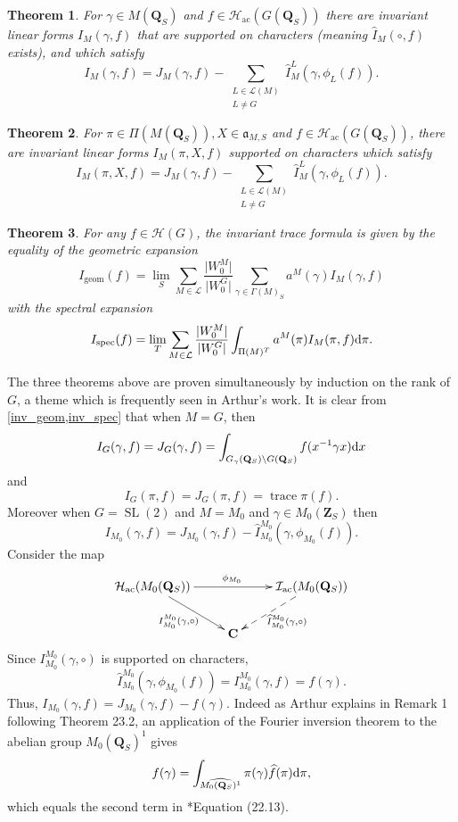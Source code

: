 \documentclass[11pt]{amsart}
\def\C{\mathbf C}
\def\Q{\mathbf Q}
\def\Z{\mathbf Z}
\def\HHH{\mathcal H}
\def\III{\mathcal I}
\def\LLL{\mathcal L}
\def\aaa{\mathfrak a}
\def\d{\text d}
\def\bs{\setminus}
\def\mod#1{\lvert #1 \rvert} %
\def\sl{\operatorname{SL}}
\def\trace{\operatorname{trace}}
\newtheorem{theorem}{Theorem}[section]
\theoremstyle{remark}
\begin{document}
\begin{theorem} \label{inv_geom}
For $\gamma \in M(\Q_S)$ and $f \in \HHH_{\text{ac}}(G(\Q_S))$ there are invariant linear forms $I_M(\gamma, f)$ that are supported on characters (meaning $\widehat I_M(\circ, f)$ exists), and which satisfy 
\[ I_M(\gamma, f) = J_M(\gamma, f) - \sum_{\substack{L \in \LLL(M) \\ L \neq G}} \widehat I_M^L(\gamma, \phi_L(f)). \]
\end{theorem}

\begin{theorem} \label{inv_spec}
For $\pi \in \Pi(M(\Q_S)), X \in \aaa_{M, S}$ and $f \in \HHH_{\text{ac}}(G(\Q_S))$, there are invariant linear forms $I_M(\pi, X, f)$ supported on characters which satisfy
\[ I_M(\pi, X, f) = J_M(\gamma, f) - \sum_{\substack{L \in \LLL(M) \\ L \neq G}} \widehat I_M^L(\gamma, \phi_L(f)). \]
\end{theorem}

\begin{theorem} \label{invtf}
For any $f \in \HHH(G)$, the invariant trace formula is given by the equality of the geometric expansion
\[ I_{\text{geom}}(f) = \lim_S \sum_{M \in \LLL} \frac{\mod{W_0^M}}{\mod{W_0^G}} \sum_{\gamma \in \Gamma(M)_S} a^M(\gamma) I_M(\gamma, f) \]
with the spectral expansion
\[ I_{\text{spec}}(f) = \lim_T \sum_{M \in \LLL} \frac{\mod{W_0^M}}{\mod{W_0^G}} \int_{\Pi(M)^T} a^M(\pi) I_M(\pi, f) \d \pi. \]
\end{theorem}

The three theorems above are proven simultaneously by induction on the rank of $G$, a theme which is frequently seen in Arthur's work. It is clear from \cref{inv_geom,inv_spec} that when $M=G$, then
\[ I_G(\gamma, f) = J_G(\gamma, f) = \int_{G_\gamma(\Q_S)\bs G(\Q_S)} f(x^{-1}\gamma x) \d x \]
and 
\[ I_G(\pi, f) = J_G(\pi, f) = \trace \pi(f). \]
Moreover when $G = \sl(2)$ and $M = M_0$ and $\gamma \in M_0(\Z_S)$ then 
\[ I_{M_0}(\gamma, f) = J_{M_0}(\gamma, f) - \widehat I_{M_0}^{M_0} (\gamma, \phi_{M_0}(f)). \]
Consider the map
\[ \xymatrix{\HHH_{\text{ac}}(M_0(\Q_S)) \ar[rr]^{\phi_{M_0}}  \ar[dr]_{I_{M_0}^{M_0}(\gamma, \circ)} && \III_{\text{ac}}(M_0(\Q_S)) \ar@{-->}[dl]^{\widehat I_{M_0}^{M_0} (\gamma, \circ)} \\ & \C & } \]
Since $I_{M_0}^{M_0}(\gamma, \circ)$ is supported on characters, 
\[ \widehat I_{M_0}^{M_0}(\gamma, \phi_{M_0}(f)) = I_{M_0}^{M_0}(\gamma, f) = f(\gamma). \]
Thus, $I_{M_0}(\gamma, f) = J_{M_0}(\gamma, f) - f(\gamma)$. Indeed as Arthur explains in Remark 1 following Theorem 23.2, an application of the Fourier inversion theorem to the abelian group $M_0(\Q_S)^1$ gives
\begin{equation} \label{f_gamma}
f(\gamma) = \int_{\widehat{M_0(\Q_S)^1}} \pi(\gamma) \widehat f(\pi) \d \pi, 
\end{equation}
which equals the second term in \cite{clay}*{Equation (22.13)}. 
\end{document}
